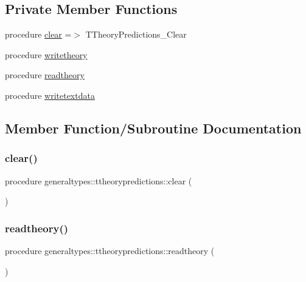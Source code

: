 \subsection*{Private Member Functions}
\begin{DoxyCompactItemize}
\item 
procedure \mbox{\hyperlink{structgeneraltypes_1_1ttheorypredictions_a964d589ce47f357ed79d4441c22bc87c}{clear}} =$>$ T\+Theory\+Predictions\+\_\+\+Clear
\item 
procedure \mbox{\hyperlink{structgeneraltypes_1_1ttheorypredictions_ac81b8848faec0fdaf6776019484de1c7}{writetheory}}
\item 
procedure \mbox{\hyperlink{structgeneraltypes_1_1ttheorypredictions_acb1957944db0f96f979c0501e2043f77}{readtheory}}
\item 
procedure \mbox{\hyperlink{structgeneraltypes_1_1ttheorypredictions_aa66feb74aae3d343a5474c0b2183c7e5}{writetextdata}}
\end{DoxyCompactItemize}


\subsection{Member Function/\+Subroutine Documentation}
\mbox{\label{structgeneraltypes_1_1ttheorypredictions_a964d589ce47f357ed79d4441c22bc87c}} 
\subsubsection{\texorpdfstring{clear()}{clear()}}
{\footnotesize\ttfamily procedure generaltypes\+::ttheorypredictions\+::clear (\begin{DoxyParamCaption}{ }\end{DoxyParamCaption})\hspace{0.3cm}{\ttfamily [private]}}

\mbox{\label{structgeneraltypes_1_1ttheorypredictions_acb1957944db0f96f979c0501e2043f77}} 
\subsubsection{\texorpdfstring{readtheory()}{readtheory()}}
{\footnotesize\ttfamily procedure generaltypes\+::ttheorypredictions\+::readtheory (\begin{DoxyParamCaption}{ }\end{DoxyParamCaption})\hspace{0.3cm}{\ttfamily [private]}}

